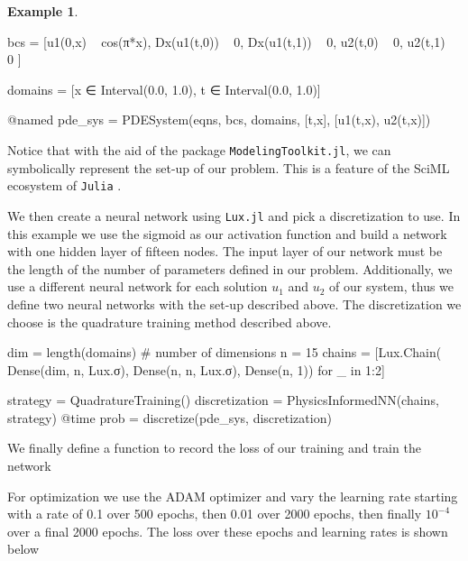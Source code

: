 \documentclass{CUP-JNL-DTM}%
\theoremstyle{definition}
\newtheorem{example}[theorem]{Example}
\numberwithin{equation}{section}
\newcommand{\Julia}{\texttt{Julia} }
\begin{document}
\begin{example}
\begin{jllisting}
bcs = [u1(0,x) ~ cos(π*x),
        Dx(u1(t,0)) ~ 0,
        Dx(u1(t,1)) ~ 0,
        u2(t,0) ~ 0,
        u2(t,1) ~ 0
]

domains = [x ∈ Interval(0.0, 1.0),
            t ∈ Interval(0.0, 1.0)]

@named pde_sys = PDESystem(eqns, bcs, domains, [t,x], [u1(t,x), u2(t,x)])
\end{jllisting}
Notice that with the aid of the package \texttt{ModelingToolkit.jl}, we can symbolically represent the set-up of our problem. This is a feature of the SciML ecosystem of \Julia. 

We then create a neural network using \texttt{Lux.jl} and pick a discretization to use. In this example we use the sigmoid as our activation function and build a network with one hidden layer of fifteen nodes. The input layer of our network must be the length of the number of parameters defined in our problem. Additionally, we use a different neural network for each solution $u_1$ and $u_2$ of our system, thus we define two neural networks with the set-up described above. The discretization we choose is the quadrature training method described above. 

\begin{jllisting}
dim = length(domains) # number of dimensions
n = 15
chains = [Lux.Chain(
            Dense(dim, n, Lux.σ), 
            Dense(n, n, Lux.σ), 
            Dense(n, 1)) for _ in 1:2]

strategy = QuadratureTraining()
discretization = PhysicsInformedNN(chains, strategy)
@time prob = discretize(pde_sys, discretization)
\end{jllisting}

We finally define a function to record the loss of our training and train the network

For optimization we use the ADAM optimizer and vary the learning rate starting with a rate of 0.1 over 500 epochs, then 0.01 over 2000 epochs, then finally $10^{-4}$ over a final 2000 epochs. The loss over these epochs and learning rates is shown below


\end{example}
\end{document}
